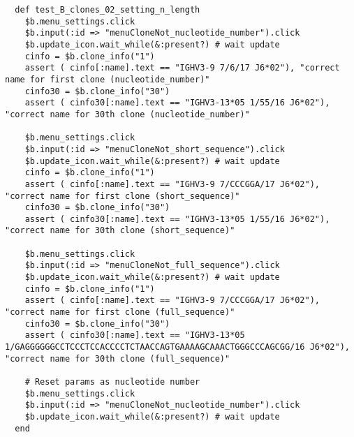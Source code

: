 \begin{verbatim}
  def test_B_clones_02_setting_n_length
    $b.menu_settings.click
    $b.input(:id => "menuCloneNot_nucleotide_number").click
    $b.update_icon.wait_while(&:present?) # wait update
    cinfo = $b.clone_info("1")
    assert ( cinfo[:name].text == "IGHV3-9 7/6/17 J6*02"), "correct name for first clone (nucleotide_number)"
    cinfo30 = $b.clone_info("30")
    assert ( cinfo30[:name].text == "IGHV3-13*05 1/55/16 J6*02"), "correct name for 30th clone (nucleotide_number)"

    $b.menu_settings.click
    $b.input(:id => "menuCloneNot_short_sequence").click
    $b.update_icon.wait_while(&:present?) # wait update
    cinfo = $b.clone_info("1")
    assert ( cinfo[:name].text == "IGHV3-9 7/CCCGGA/17 J6*02"), "correct name for first clone (short_sequence)"
    cinfo30 = $b.clone_info("30")
    assert ( cinfo30[:name].text == "IGHV3-13*05 1/55/16 J6*02"), "correct name for 30th clone (short_sequence)"

    $b.menu_settings.click
    $b.input(:id => "menuCloneNot_full_sequence").click
    $b.update_icon.wait_while(&:present?) # wait update
    cinfo = $b.clone_info("1")
    assert ( cinfo[:name].text == "IGHV3-9 7/CCCGGA/17 J6*02"), "correct name for first clone (full_sequence)"
    cinfo30 = $b.clone_info("30")
    assert ( cinfo30[:name].text == "IGHV3-13*05 1/GAGGGGGGCCTCCCTCCACCCCTCTAACCAGTGAAAAGCAAACTGGGCCCAGCGG/16 J6*02"), "correct name for 30th clone (full_sequence)"

    # Reset params as nucleotide number
    $b.menu_settings.click
    $b.input(:id => "menuCloneNot_nucleotide_number").click
    $b.update_icon.wait_while(&:present?) # wait update
  end
\end{verbatim}



